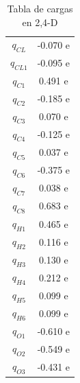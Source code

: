 \begin{table}[!h]
    \centering
    \begin{tabular}{|c|c|}
    \hline
    \large{$q_{CL}$} & -0.070 e \\
    \large{$q_{CL1}$} & -0.095 e \\
    \large{$q_{C1}$} & 0.491 e \\
    \large{$q_{C2}$} & -0.185 e \\
    \large{$q_{C3}$} & 0.070 e \\
    \large{$q_{C4}$} & -0.125 e \\
    \large{$q_{C5}$} & 0.037 e \\
    \large{$q_{C6}$} & -0.375 e \\
    \large{$q_{C7}$} & 0.038 e \\
    \large{$q_{C8}$} & 0.683 e \\
    \large{$q_{H1}$} & 0.465 e \\
    \large{$q_{H2}$} & 0.116 e \\
    \large{$q_{H3}$} & 0.130 e \\
    \large{$q_{H4}$} & 0.212 e \\
    \large{$q_{H5}$} & 0.099 e \\
    \large{$q_{H6}$} & 0.099 e \\
    \large{$q_{O1}$} & -0.610 e \\
    \large{$q_{O2}$} & -0.549 e \\
    \large{$q_{O3}$} & -0.431 e \\
    \hline
    \end{tabular}
    \caption{Tabla de cargas en 2,4-D}
    \label{tab:cargas24D}
\end{table}



